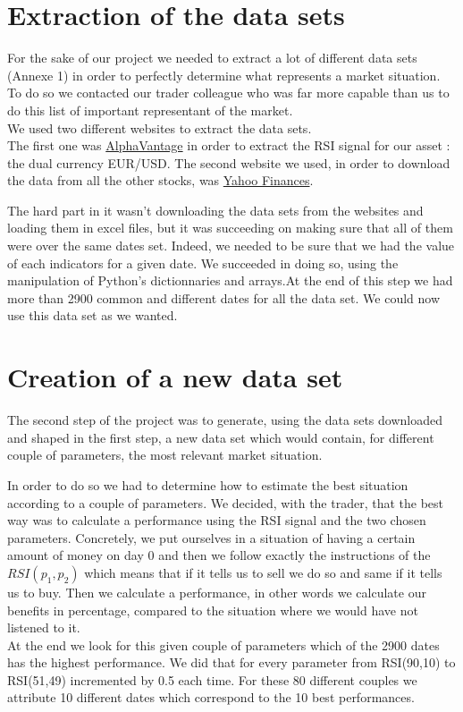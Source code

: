 \documentclass[]{article}
\begin{document}
\section{Extraction of the data sets}

\vskip 0.5cm
For the sake of our project we needed to extract a lot of different data sets (Annexe 1) in order to perfectly determine what represents a market situation. To do so we contacted our trader colleague who was far more capable than us to do this list of important representant of the market.\\
We used two different websites to extract the data sets.\\
The first one was \href{https://www.alphavantage.co/}{AlphaVantage} in order to extract the RSI signal for our asset : the dual currency EUR/USD.
The second website we used, in order to download the data from all the other stocks, was \href{https://fr.finance.yahoo.com/}{Yahoo Finances}. 

\vskip 0.5cm
The hard part in it wasn't downloading the data sets from the websites and loading them in excel files, but it was succeeding on making sure that all of them were over the same dates set. Indeed, we needed to be sure that we had the value of each indicators for a given date. We succeeded in doing so, using the manipulation of Python's dictionnaries and arrays.At the end of this step we had more than 2900 common and different dates for all the data set. We could now use this data set as we wanted.

\section{Creation of a new data set}

\vskip 0.5cm
The second step of the project was to generate, using the data sets downloaded and shaped in the first step, a new data set which would contain, for different couple of parameters, the most relevant market situation.

\vskip 0.5cm
In order to do so we had to determine how to estimate the best situation according to a couple of parameters. We decided, with the trader, that the best way was to calculate a performance using the RSI signal and the two chosen parameters. Concretely, we put ourselves in a situation of having a certain amount of money on day 0 and then we follow exactly the instructions of the \(RSI(p_1,p_2)\) which means that if it tells us to sell we do so and same if it tells us to buy. Then we calculate a performance, in other words we calculate our benefits in percentage, compared to the situation where we would have not listened to it.\\
At the end we look for this given couple of parameters which of the 2900 dates has the highest performance. We did that for every parameter from RSI(90,10) to RSI(51,49) incremented by 0.5 each time. For these 80 different couples we attribute 10 different dates which correspond to the 10 best performances. 
\end{document}

